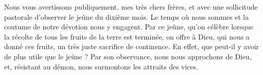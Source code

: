 Nous vous avertissons publiquement, mes très chers frères, et avec une sollicitude pastorale d’observer le jeûne du dixième mois. Le temps où nous sommes et la coutume de notre dévotion nous y engagent. Par ce jeûne, qu’on célèbre lorsque la récolte de tous les fruits de la terre est terminée, on offre à Dieu, qui nous a donné ces fruits, un très juste sacrifice de continence. En effet, que peut-il y avoir de plus utile que le jeûne ? Par son observance, nous nous approchons de Dieu, et, résistant au démon, nous surmontons les attraits des vices.